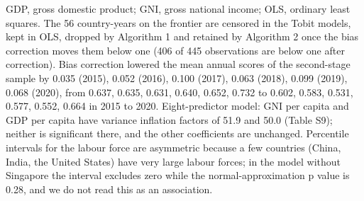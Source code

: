 \documentclass[11pt,letterpaper]{article}
\begin{document}
\begin{table}[htbp]
\vspace{4pt}
{\footnotesize GDP, gross domestic product; GNI, gross national income; OLS, ordinary least squares. The 56 country-years on the frontier are censored in the Tobit models, kept in OLS, dropped by Algorithm 1 and retained by Algorithm 2 once the bias correction moves them below one (406 of 445 observations are below one after correction). Bias correction lowered the mean annual scores of the second-stage sample by 0.035 (2015), 0.052 (2016), 0.100 (2017), 0.063 (2018), 0.099 (2019), 0.068 (2020), from 0.637, 0.635, 0.631, 0.640, 0.652, 0.732 to 0.602, 0.583, 0.531, 0.577, 0.552, 0.664 in 2015 to 2020. Eight-predictor model: GNI per capita and GDP per capita have variance inflation factors of 51.9 and 50.0 (Table S9); neither is significant there, and the other coefficients are unchanged. Percentile intervals for the labour force are asymmetric because a few countries (China, India, the United States) have very large labour forces; in the model without Singapore the interval excludes zero while the normal-approximation p value is 0.28, and we do not read this as an association.}
\end{table}
\end{document}
